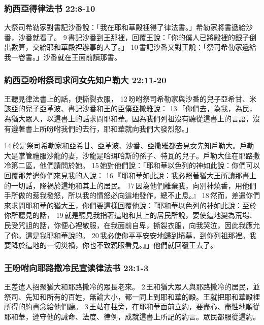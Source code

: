\subsubsection{約西亞得律法书 22:8-10}
大祭司希勒家對書記沙番說：「我在耶和華殿裡得了律法書。」希勒家將書遞給沙番，沙番就看了。 9 書記沙番到王那裡，回覆王說：「你的僕人已將殿裡的銀子倒出數算，交給耶和華殿裡辦事的人了。」 10 書記沙番又對王說：「祭司希勒家遞給我一卷書。」沙番就在王面前讀那書。

\subsubsection{約西亞吩咐祭司求问女先知户勒大 22:11-20}
王聽見律法書上的話，便撕裂衣服， 12 吩咐祭司希勒家與沙番的兒子亞希甘、米該亞的兒子亞革波、書記沙番和王的臣僕亞撒雅說： 13 「你們去，為我，為民，為猶大眾人，以這書上的話求問耶和華。因為我們列祖沒有聽從這書上的言語，沒有遵著書上所吩咐我們的去行，耶和華就向我們大發烈怒。」

14 於是祭司希勒家和亞希甘、亞革波、沙番、亞撒雅都去見女先知戶勒大。戶勒大是掌管禮服沙龍的妻，沙龍是哈珥哈斯的孫子、特瓦的兒子。戶勒大住在耶路撒冷第二區，他們請問於她。 15 她對他們說：「耶和華以色列的神如此說：你們可以回覆那差遣你們來見我的人說： 16 『耶和華如此說：我必照著猶大王所讀那書上的一切話，降禍於這地和其上的居民。 17 因為他們離棄我，向別神燒香，用他們手所做的惹我發怒，所以我的憤怒必向這地發作，總不止息。』 18 然而，差遣你們來求問耶和華的猶大王，你們要這樣回覆他說：『耶和華以色列的神如此說：至於你所聽見的話， 19 就是聽見我指著這地和其上的居民所說，要使這地變為荒場、民受咒詛的話，你便心裡敬服，在我面前自卑，撕裂衣服，向我哭泣，因此我應允了你。這是我耶和華說的。 20 我必使你平平安安地歸到墳墓，到你列祖那裡。我要降於這地的一切災禍，你也不致親眼看見。』」他們就回覆王去了。

\subsubsection{王吩咐向耶路撒冷民宣读律法书 23:1-3}
王差遣人招聚猶大和耶路撒冷的眾長老來。 2 王和猶大眾人與耶路撒冷的居民，並祭司、先知和所有的百姓，無論大小，都一同上到耶和華的殿。王就把耶和華殿裡所得的約書念給他們聽。 3 王站在柱旁，在耶和華面前立約，要盡心、盡性地順從耶和華，遵守他的誡命、法度、律例，成就這書上所記的約言。眾民都服從這約。

